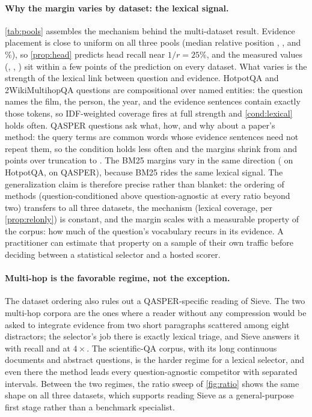 \documentclass[review,12pt]{elsarticle}
\theoremstyle{remark}
\newcommand{\method}{Sieve}
\begin{document}
\paragraph{Why the margin varies by dataset: the lexical signal.}
\label{sec:lexsignal}
\autoref{tab:pools} assembles the mechanism behind the multi-dataset
result. Evidence placement is close to uniform on all three pools
(median relative position \PoolQMedPos, \PoolHMedPos, and
\PoolWMedPos\%), so \autoref{prop:head} predicts head recall near
$1/r = 25\%$, and the measured values (\RecQHea, \RecHHea,
\RecWHea) sit within a few points of the prediction on every
dataset. What varies is the strength of the lexical link between
question and evidence. HotpotQA and 2WikiMultihopQA questions are
compositional over named entities: the question names the film, the
person, the year, and the evidence sentences contain exactly those
tokens, so IDF-weighted coverage fires at full strength and
\autoref{cond:lexical} holds often. QASPER questions ask what, how,
and why about a paper's method: the query terms are common words
whose evidence sentences need not repeat them, so the condition holds
less often and the margins shrink from \PairHSH{} and \PairWSH{}
points over truncation to \PairQSH{}. The BM25 margins vary in the
same direction (\PairHSBm{} on HotpotQA, \PairQSBm{} on QASPER),
because BM25 rides the same lexical signal. The generalization claim
is therefore precise rather than blanket: the ordering of methods
(question-conditioned above question-agnostic at every ratio beyond
two) transfers to all three datasets, the mechanism (lexical
coverage, per \autoref{prop:relonly}) is constant, and the margin
scales with a measurable property of the corpus: how much of the
question's vocabulary recurs in its evidence. A practitioner can
estimate that property on a sample of their own traffic before
deciding between a statistical selector and a hosted scorer.

\paragraph{Multi-hop is the favorable regime, not the exception.}
The dataset ordering also rules out a QASPER-specific reading of
\method{}. The two multi-hop corpora are the ones where a reader
without any compression would be asked to integrate evidence from two
short paragraphs scattered among eight distractors; the selector's job
there is exactly lexical triage, and \method{} answers it with recall
\RecHSie{} and \RecWSie{} at $4\times$. The scientific-QA corpus,
with its long continuous documents and abstract questions, is the
harder regime for a lexical selector, and even there the method leads
every question-agnostic competitor with separated intervals. Between
the two regimes, the ratio sweep of \autoref{fig:ratio} shows the same
shape on all three datasets, which supports reading \method{} as a
general-purpose first stage rather than a benchmark specialist.
\end{document}
